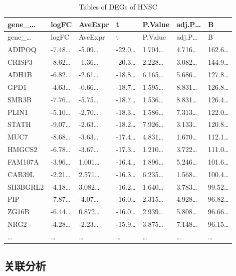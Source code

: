 \documentclass[
]{article}
\begin{document}
\begin{longtable}[]{@{}lllllll@{}}
\caption{\label{tab:tables-of-DEGs-of-HNSC}Tables of DEGs of HNSC}\tabularnewline
\toprule
gene\_\ldots{} & logFC & AveExpr & t & P.Value & adj.P\ldots{} & B\tabularnewline
\midrule
\endfirsthead
\toprule
gene\_\ldots{} & logFC & AveExpr & t & P.Value & adj.P\ldots{} & B\tabularnewline
\midrule
\endhead
ADIPOQ & -7.48\ldots{} & -5.09\ldots{} & -22.0\ldots{} & 1.704\ldots{} & 4.716\ldots{} & 162.6\ldots{}\tabularnewline
CRISP3 & -8.62\ldots{} & -1.36\ldots{} & -20.3\ldots{} & 2.228\ldots{} & 3.082\ldots{} & 144.9\ldots{}\tabularnewline
ADH1B & -6.82\ldots{} & -2.61\ldots{} & -18.8\ldots{} & 6.165\ldots{} & 5.686\ldots{} & 127.8\ldots{}\tabularnewline
GPD1 & -4.63\ldots{} & -0.66\ldots{} & -18.7\ldots{} & 1.595\ldots{} & 8.831\ldots{} & 126.8\ldots{}\tabularnewline
SMR3B & -7.76\ldots{} & -5.75\ldots{} & -18.7\ldots{} & 1.536\ldots{} & 8.831\ldots{} & 126.4\ldots{}\tabularnewline
PLIN1 & -5.10\ldots{} & -2.70\ldots{} & -18.3\ldots{} & 1.586\ldots{} & 7.313\ldots{} & 122.0\ldots{}\tabularnewline
STATH & -9.07\ldots{} & -2.63\ldots{} & -18.2\ldots{} & 7.926\ldots{} & 3.133\ldots{} & 120.8\ldots{}\tabularnewline
MUC7 & -8.68\ldots{} & -3.63\ldots{} & -17.4\ldots{} & 4.831\ldots{} & 1.670\ldots{} & 112.1\ldots{}\tabularnewline
HMGCS2 & -6.78\ldots{} & -3.67\ldots{} & -17.3\ldots{} & 1.210\ldots{} & 3.722\ldots{} & 111.0\ldots{}\tabularnewline
FAM107A & -3.96\ldots{} & 1.001\ldots{} & -16.4\ldots{} & 1.896\ldots{} & 5.246\ldots{} & 101.6\ldots{}\tabularnewline
CAB39L & -2.21\ldots{} & 2.571\ldots{} & -16.3\ldots{} & 6.235\ldots{} & 1.568\ldots{} & 100.4\ldots{}\tabularnewline
SH3BGRL2 & -4.18\ldots{} & 3.082\ldots{} & -16.2\ldots{} & 1.640\ldots{} & 3.783\ldots{} & 99.52\ldots{}\tabularnewline
PIP & -7.87\ldots{} & -4.07\ldots{} & -16.0\ldots{} & 2.315\ldots{} & 4.928\ldots{} & 96.82\ldots{}\tabularnewline
ZG16B & -6.44\ldots{} & 0.872\ldots{} & -16.0\ldots{} & 2.939\ldots{} & 5.808\ldots{} & 96.66\ldots{}\tabularnewline
NRG2 & -4.28\ldots{} & -2.23\ldots{} & -15.9\ldots{} & 3.875\ldots{} & 7.148\ldots{} & 96.15\ldots{}\tabularnewline
\ldots{} & \ldots{} & \ldots{} & \ldots{} & \ldots{} & \ldots{} & \ldots{}\tabularnewline
\bottomrule
\end{longtable}

\hypertarget{ux5173ux8054ux5206ux6790}{%
\subsection{关联分析}\label{ux5173ux8054ux5206ux6790}}
\end{document}
